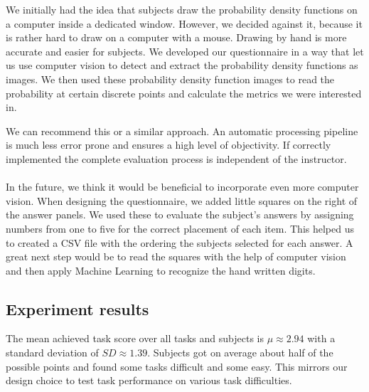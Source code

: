 \documentclass[../main/main.tex]{subfiles}
\begin{document}
	We initially had the idea that subjects draw the probability density functions on a computer inside a dedicated window. However, we decided against it, because it is rather hard to draw on a computer with a mouse. Drawing by hand is more accurate and easier for subjects. We developed our questionnaire in a way that let us use computer vision to detect and extract the probability density functions as images. We then used these probability density function images to read the probability at certain discrete points and calculate the metrics we were interested in.
	
	We can recommend this or a similar approach. An automatic processing pipeline is much less error prone and ensures a high level of objectivity. If correctly implemented the complete evaluation process is independent of the instructor. 
	\\\\
	In the future, we think it would be beneficial to incorporate even more computer vision. When designing the questionnaire, we added little squares on the right of the answer panels. We used these to evaluate the subject's answers by assigning numbers from one to five for the correct placement of each item. This helped us to created a CSV file with the ordering the subjects selected for each answer. A great next step would be to read the squares with the help of computer vision and then apply Machine Learning to recognize the hand written digits. 
	
	\subsection{Experiment results}
	\label{sec:exp_results}
	
	The mean achieved task score over all tasks and subjects is $\mu  \approx 2.94$ with a standard deviation of $SD \approx 1.39$. Subjects got on average about half of the possible points and found some tasks difficult and some easy. This mirrors our design choice to test task performance on various task difficulties.
	
\end{document}
